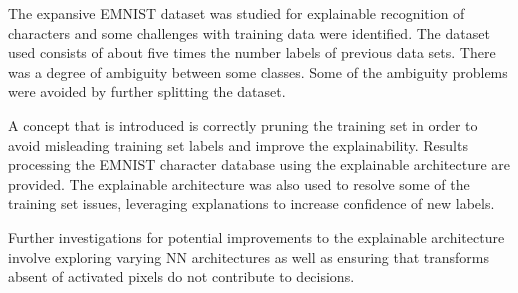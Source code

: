 \documentclass[conference]{IEEEtran}
\begin{document}
The expansive EMNIST dataset was studied for explainable recognition of
characters and some challenges with training data were identified.  The dataset
used consists of about five times the number labels of previous data sets.
There was a degree of ambiguity between some classes. Some of the ambiguity
problems were avoided by further splitting the dataset.

A concept that is introduced is correctly pruning the training set in order to
avoid misleading training set labels and improve the explainability. Results
processing the EMNIST character database using the explainable architecture are
provided. The explainable architecture was also used to resolve some of the training set
issues, leveraging explanations to increase confidence of new labels.

Further investigations for potential improvements to the explainable architecture
involve exploring varying NN architectures as well as ensuring that transforms
absent of activated pixels do not contribute to decisions. 



\end{document}
